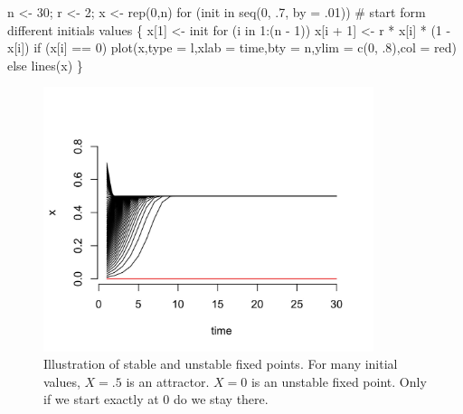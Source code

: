 \documentclass[
  letterpaper,
]{scrbook}
\newenvironment{Shaded}{\begin{snugshade}}{\end{snugshade}}
\newcommand{\AttributeTok}[1]{\textcolor[rgb]{0.40,0.45,0.13}{#1}}
\newcommand{\CommentTok}[1]{\textcolor[rgb]{0.37,0.37,0.37}{#1}}
\newcommand{\ControlFlowTok}[1]{\textcolor[rgb]{0.00,0.23,0.31}{#1}}
\newcommand{\DecValTok}[1]{\textcolor[rgb]{0.68,0.00,0.00}{#1}}
\newcommand{\FunctionTok}[1]{\textcolor[rgb]{0.28,0.35,0.67}{#1}}
\newcommand{\NormalTok}[1]{\textcolor[rgb]{0.00,0.23,0.31}{#1}}
\newcommand{\OtherTok}[1]{\textcolor[rgb]{0.00,0.23,0.31}{#1}}
\newcommand{\SpecialCharTok}[1]{\textcolor[rgb]{0.37,0.37,0.37}{#1}}
\newcommand{\StringTok}[1]{\textcolor[rgb]{0.13,0.47,0.30}{#1}}
\begin{document}
\begin{Shaded}
\begin{Highlighting}[]
\NormalTok{n }\OtherTok{\textless{}{-}} \DecValTok{30}\NormalTok{; r }\OtherTok{\textless{}{-}} \DecValTok{2}\NormalTok{; x }\OtherTok{\textless{}{-}} \FunctionTok{rep}\NormalTok{(}\DecValTok{0}\NormalTok{,n)}
\ControlFlowTok{for}\NormalTok{ (init }\ControlFlowTok{in} \FunctionTok{seq}\NormalTok{(}\DecValTok{0}\NormalTok{, .}\DecValTok{7}\NormalTok{, }\AttributeTok{by =}\NormalTok{ .}\DecValTok{01}\NormalTok{))}
  \CommentTok{\# start form different initials values}
\NormalTok{\{ }
\NormalTok{  x[}\DecValTok{1}\NormalTok{] }\OtherTok{\textless{}{-}}\NormalTok{ init}
  \ControlFlowTok{for}\NormalTok{ (i }\ControlFlowTok{in} \DecValTok{1}\SpecialCharTok{:}\NormalTok{(n }\SpecialCharTok{{-}} \DecValTok{1}\NormalTok{))}
\NormalTok{    x[i }\SpecialCharTok{+} \DecValTok{1}\NormalTok{] }\OtherTok{\textless{}{-}}\NormalTok{ r }\SpecialCharTok{*}\NormalTok{ x[i] }\SpecialCharTok{*}\NormalTok{ (}\DecValTok{1} \SpecialCharTok{{-}}\NormalTok{ x[i])}
  \ControlFlowTok{if}\NormalTok{ (x[i] }\SpecialCharTok{==} \DecValTok{0}\NormalTok{)}
    \FunctionTok{plot}\NormalTok{(x,}\AttributeTok{type =} \StringTok{\textquotesingle{}l\textquotesingle{}}\NormalTok{,}\AttributeTok{xlab =} \StringTok{\textquotesingle{}time\textquotesingle{}}\NormalTok{,}\AttributeTok{bty =} \StringTok{\textquotesingle{}n\textquotesingle{}}\NormalTok{,}\AttributeTok{ylim =} \FunctionTok{c}\NormalTok{(}\DecValTok{0}\NormalTok{, .}\DecValTok{8}\NormalTok{),}\AttributeTok{col =} \StringTok{\textquotesingle{}red\textquotesingle{}}\NormalTok{)}
  \ControlFlowTok{else}
    \FunctionTok{lines}\NormalTok{(x)}
\NormalTok{\}}
\end{Highlighting}
\end{Shaded}

\begin{figure}

{\centering \includegraphics[width=3.80589in,height=3.04376in]{media/ch2/image3.jpg}

}

\caption{\label{fig-ch2-img3}Illustration of stable and unstable fixed
points. For many initial values, \(X = .5\) is an attractor. \(X = 0\)
is an unstable fixed point. Only if we start exactly at 0 do we stay
there.}

\end{figure}
\end{document}
